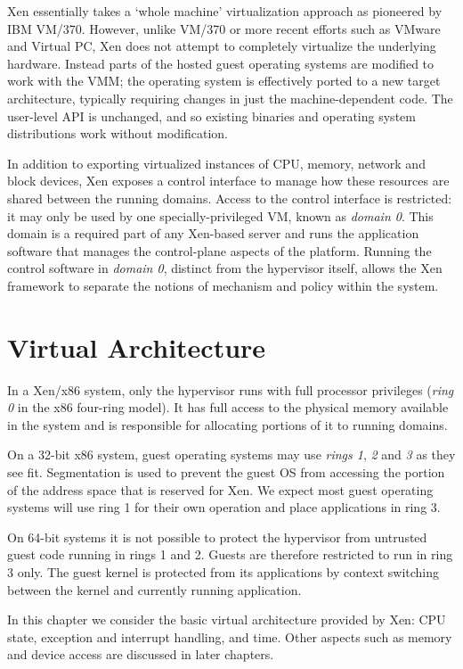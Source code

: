 \documentclass[11pt,twoside,final,openright]{report}
\begin{document}
Xen essentially takes a `whole machine' virtualization approach as
pioneered by IBM VM/370.  However, unlike VM/370 or more recent
efforts such as VMware and Virtual PC, Xen does not attempt to
completely virtualize the underlying hardware.  Instead parts of the
hosted guest operating systems are modified to work with the VMM; the
operating system is effectively ported to a new target architecture,
typically requiring changes in just the machine-dependent code.  The
user-level API is unchanged, and so existing binaries and operating
system distributions work without modification.

In addition to exporting virtualized instances of CPU, memory, network
and block devices, Xen exposes a control interface to manage how these
resources are shared between the running domains. Access to the
control interface is restricted: it may only be used by one
specially-privileged VM, known as {\em domain 0}.  This domain is a
required part of any Xen-based server and runs the application software
that manages the control-plane aspects of the platform.  Running the
control software in {\it domain 0}, distinct from the hypervisor
itself, allows the Xen framework to separate the notions of 
mechanism and policy within the system.


\chapter{Virtual Architecture}

In a Xen/x86 system, only the hypervisor runs with full processor
privileges ({\it ring 0} in the x86 four-ring model). It has full
access to the physical memory available in the system and is
responsible for allocating portions of it to running domains.  

On a 32-bit x86 system, guest operating systems may use {\it rings 1},
{\it 2} and {\it 3} as they see fit.  Segmentation is used to prevent
the guest OS from accessing the portion of the address space that is
reserved for Xen.  We expect most guest operating systems will use
ring 1 for their own operation and place applications in ring 3.

On 64-bit systems it is not possible to protect the hypervisor from
untrusted guest code running in rings 1 and 2. Guests are therefore
restricted to run in ring 3 only. The guest kernel is protected from its
applications by context switching between the kernel and currently
running application.

In this chapter we consider the basic virtual architecture provided by
Xen: CPU state, exception and interrupt handling, and time.
Other aspects such as memory and device access are discussed in later
chapters.
\end{document}
